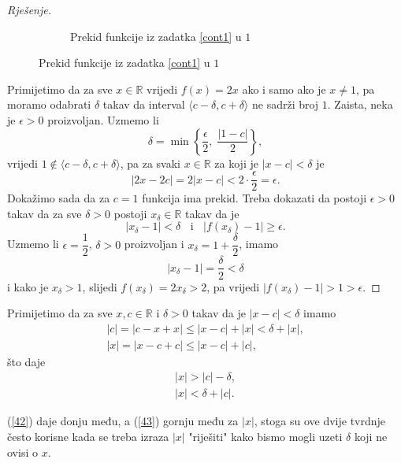 \begin{proof}[Rješenje]
\begin{figure}[ht]
\begin{subfigure}[t]{.5\textwidth}
\caption{Prekid funkcije iz zadatka \ref{cont1} u $1$}
\end{subfigure}
\end{figure}

Primijetimo da za sve $x\in \mathbb{R}$ vrijedi $f(x)=2x$ ako i samo ako je $x\neq 1$, pa moramo odabrati $\delta$ takav da interval $\langle c-\delta, c+\delta\rangle$ ne sadrži broj $1$. Zaista, neka je $\epsilon>0$ proizvoljan. Uzmemo li $$\delta=\min\left \{\dfrac{\epsilon}{2},\; \dfrac{|1-c|}{2}\right\},$$
vrijedi $1\notin \langle c-\delta, c+\delta\rangle$, pa za svaki $x\in \mathbb{R}$ za koji je $|x-c|<\delta$ je $$|2x-2c|=2|x-c|<2\cdot \dfrac{\epsilon}{2}=\epsilon.$$ 
Dokažimo sada da za $c=1$ funkcija ima prekid. Treba dokazati da postoji $\epsilon>0$ takav da za sve $\delta>0$ postoji $x_\delta\in \mathbb{R}$ takav da je 
$$|x_\delta-1|<\delta\;\;\text{ i }\;\;|f(x_\delta)-1|\geq \epsilon.$$ 
Uzmemo li $\epsilon=\dfrac{1}{2}$, $\delta>0$ proizvoljan i $x_\delta=1+\dfrac{\delta}{2}$, imamo 
$$|x_\delta-1|=\dfrac{\delta}{2}<\delta$$ 
i kako je $x_\delta> 1$, slijedi $f(x_\delta)=2x_\delta>2$, pa vrijedi $|f(x_\delta)-1|>1> \epsilon$.
\end{proof}
\begin{remark}
Primijetimo da za sve $x, c\in \mathbb{R}$ i $\delta>0$ takav da je $|x-c|<\delta$ imamo
\begin{gather*}
|c|=|c-x+x|\leq |x-c|+|x|<\delta+|x|,\\
|x|=|x-c+c|\leq |x-c|+|c|,
\end{gather*}
što daje
\begin{gather}
\label{42}
|x|>|c|-\delta,\\
\label{43}
|x|<\delta+|c|.
\end{gather}

\noindent (\ref{42}) daje donju među, a (\ref{43}) gornju među za $|x|$, stoga su ove dvije tvrdnje često korisne kada se treba izraza $|x|$ "riješiti" kako bismo mogli uzeti $\delta$ koji ne ovisi o $x$.
\end{remark}
